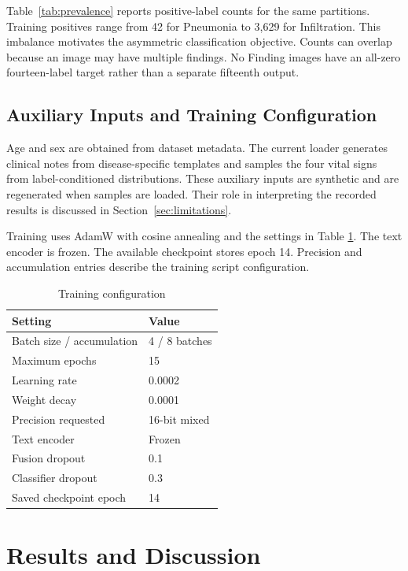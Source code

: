 \documentclass[conference,letterpaper]{IEEEtran}
\begin{document}
Table~\ref{tab:prevalence} reports positive-label counts for the same partitions. Training positives range from 42 for Pneumonia to 3,629 for Infiltration. This imbalance motivates the asymmetric classification objective. Counts can overlap because an image may have multiple findings. No Finding images have an all-zero fourteen-label target rather than a separate fifteenth output.

\subsection{Auxiliary Inputs and Training Configuration}

Age and sex are obtained from dataset metadata. The current loader generates clinical notes from disease-specific templates and samples the four vital signs from label-conditioned distributions. These auxiliary inputs are synthetic and are regenerated when samples are loaded. Their role in interpreting the recorded results is discussed in Section~\ref{sec:limitations}.

Training uses AdamW with cosine annealing and the settings in Table \ref{tab:training}. The text encoder is frozen. The available checkpoint stores epoch 14. Precision and accumulation entries describe the training script configuration.

\begin{table}[t]\caption{Training configuration}\label{tab:training}\centering\footnotesize\begin{tabular}{@{}p{}p{}@{}}\toprule Setting & Value\\\midrule Batch size / accumulation & 4 / 8 batches\\Maximum epochs & 15\\Learning rate & 0.0002\\Weight decay & 0.0001\\Precision requested & 16-bit mixed\\Text encoder & Frozen\\Fusion dropout & 0.1\\Classifier dropout & 0.3\\Saved checkpoint epoch & 14\\\bottomrule\end{tabular}\end{table}

\section{Results and Discussion}\label{sec:results}
\end{document}
